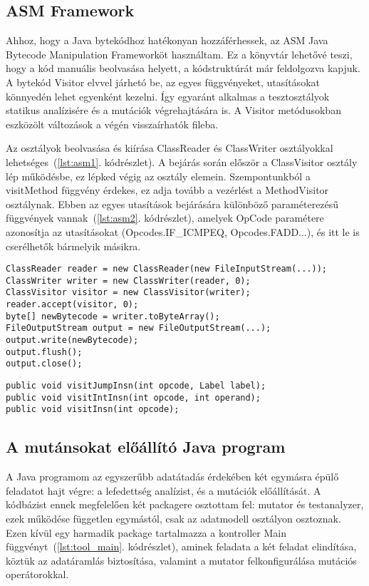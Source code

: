 \subsection{ASM Framework}
Ahhoz, hogy a Java bytekódhoz hatékonyan hozzáférhessek, az ASM Java Bytecode Manipulation Frameworköt használtam. Ez a könyvtár lehetővé teszi, hogy a kód manuális beolvasása helyett, a kódstruktúrát már feldolgozva kapjuk. A bytekód Visitor elvvel járhetó be, az egyes függvényeket, utasításokat könnyedén lehet egyenként kezelni. Így egyaránt alkalmas a tesztosztályok statikus analízisére és a mutációk végrehajtására is. A Visitor metódusokban eszközölt változások a végén visszaírhatók fileba.

Az osztályok beolvasása és kiírása ClassReader és ClassWriter osztályokkal lehetséges~(\ref{lst:asm1}. kódrészlet). A bejárás során először a ClassVisitor osztály lép működésbe, ez lépked végig az osztály elemein. Szempontunkból a visitMethod függvény érdekes, ez adja tovább a vezérlést a MethodVisitor osztálynak. Ebben az egyes utasítások bejárására különböző paraméterezésű függvények vannak~(\ref{lst:asm2}. kódrészlet), amelyek OpCode paramétere azonosítja az utasításokat (Opcodes.IF\_ICMPEQ, Opcodes.FADD...), és itt le is cserélhetők bármelyik másikra. 


\begin{lstlisting}[frame=single,float=!ht,caption={Java bytekód beolvasása, feldolgozása, kiíratása ASM segítségével},captionpos=b,label={lst:asm1}]
ClassReader reader = new ClassReader(new FileInputStream(...));
ClassWriter writer = new ClassWriter(reader, 0);
ClassVisitor visitor = new ClassVisitor(writer);
reader.accept(visitor, 0);
byte[] newBytecode = writer.toByteArray();
FileOutputStream output = new FileOutputStream(...);
output.write(newBytecode);
output.flush();
output.close();
\end{lstlisting}

\begin{lstlisting}[frame=single,float=!ht,caption={A MethodVisitor általam használt bejáró függvényeinek fejlécei},captionpos=b,label={lst:asm2}]
public void visitJumpInsn(int opcode, Label label);
public void visitIntInsn(int opcode, int operand);
public void visitInsn(int opcode);
\end{lstlisting}

\subsection{A mutánsokat előállító Java program}
A Java programom az egyszerűbb adatátadás érdekében két egymásra épülő feladatot hajt végre: a lefedettség analízist, és a mutációk előállítását. A kódbázist ennek megfelelően két packagere osztottam fel: mutator és testanalyzer, ezek működése független egymástól, csak az adatmodell osztályon osztoznak. Ezen kívül egy harmadik package tartalmazza a kontroller Main függvényt~(\ref{lst:tool_main}. kódrészlet), aminek feladata a két feladat elindítása, köztük az adatáramlás biztosítása, valamint a mutator felkonfigurálása mutációs operátorokkal.

